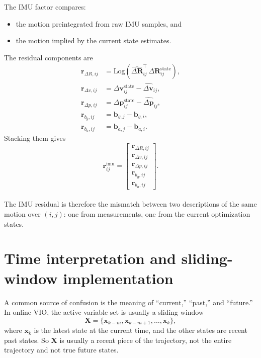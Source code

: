 \documentclass[11pt]{article}
\newcommand{\Log}{\mathrm{Log}}
\newcommand{\T}{^{\top}}
\begin{document}
The IMU factor compares:
\begin{itemize}
  \item the motion preintegrated from raw IMU samples, and
  \item the motion implied by the current state estimates.
\end{itemize}
The residual components are
\begin{align}
\mathbf{r}_{\Delta R,ij}
&= \Log\!\left( \widehat{\Delta \mathbf{R}}_{ij}\T\,\Delta \mathbf{R}^{\mathrm{state}}_{ij} \right), \\
\mathbf{r}_{\Delta v,ij}
&= \Delta \mathbf{v}^{\mathrm{state}}_{ij} - \widehat{\Delta \mathbf{v}}_{ij}, \\
\mathbf{r}_{\Delta p,ij}
&= \Delta \mathbf{p}^{\mathrm{state}}_{ij} - \widehat{\Delta \mathbf{p}}_{ij}, \\
\mathbf{r}_{b_g,ij}
&= \mathbf{b}_{g,j} - \mathbf{b}_{g,i}, \\
\mathbf{r}_{b_a,ij}
&= \mathbf{b}_{a,j} - \mathbf{b}_{a,i}.
\end{align}
Stacking them gives
\begin{equation}
\mathbf{r}^{\mathrm{imu}}_{ij} =
\begin{bmatrix}
\mathbf{r}_{\Delta R,ij} \\
\mathbf{r}_{\Delta v,ij} \\
\mathbf{r}_{\Delta p,ij} \\
\mathbf{r}_{b_g,ij} \\
\mathbf{r}_{b_a,ij}
\end{bmatrix}.
\end{equation}
\\
The IMU residual is therefore the mismatch between two descriptions of the same motion over \((i,j)\): one from measurements, one from the current optimization states.

\section{Time interpretation and sliding-window implementation}

A common source of confusion is the meaning of ``current,'' ``past,'' and ``future.''
In online VIO, the active variable set is usually a sliding window
\begin{equation}
\mathbf{X} = \{\mathbf{x}_{k-m},\mathbf{x}_{k-m+1},\dots,\mathbf{x}_{k}\},
\end{equation}
where \(\mathbf{x}_k\) is the latest state at the current time, and the other states are recent past states.
So \(\mathbf{X}\) is usually a recent piece of the trajectory, not the entire trajectory and not true future states.
\\
\end{document}
